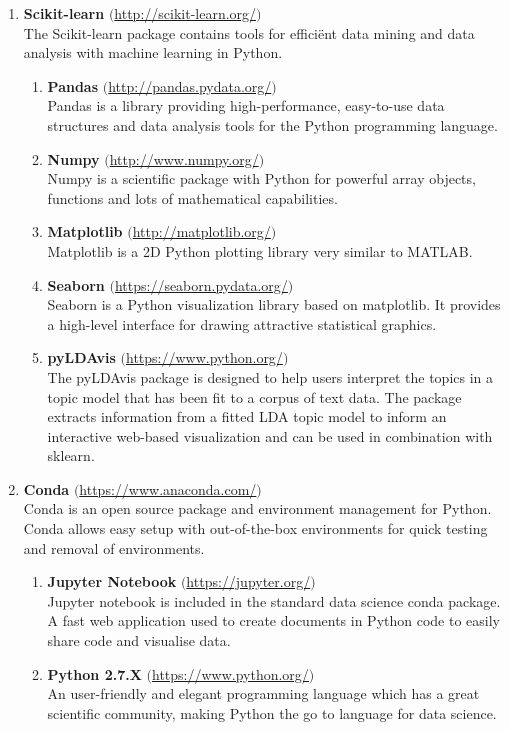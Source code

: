 \begin{enumerate}
    \item \textbf{Scikit-learn} $($\url{http://scikit-learn.org/}$)$ \\
    The Scikit-learn package contains tools for effici\"ent data mining and data analysis with machine learning in Python.
    \begin{enumerate}
        \item \textbf{Pandas} $($\url{http://pandas.pydata.org/}$)$ \\
        Pandas is a library providing high-performance, easy-to-use data structures and data analysis tools for the Python programming language.
        \item \textbf{Numpy} $($\url{http://www.numpy.org/}$)$ \\
        Numpy is a scientific package with Python for powerful array objects, functions and lots of mathematical capabilities.
        \item \textbf{Matplotlib} $($\url{http://matplotlib.org/}$)$ \\
        Matplotlib is a 2D Python plotting library very similar to MATLAB.
        \item \textbf{Seaborn} $($\url{https://seaborn.pydata.org/}$)$ \\
        Seaborn is a Python visualization library based on matplotlib. It provides a high-level interface for drawing attractive statistical graphics.
        \item \textbf{pyLDAvis} $($\url{https://www.python.org/}$)$\\
        The pyLDAvis package is designed to help users interpret the topics in a topic model that has been fit to a corpus of text data. The package extracts information from a fitted LDA topic model to inform an interactive web-based visualization and can be used in combination with sklearn.
    \end{enumerate}
    
    \item \textbf{Conda} $($\url{https://www.anaconda.com/}$)$ \\
    Conda is an open source package and environment management for Python. Conda allows easy setup with out-of-the-box environments for quick testing and removal of environments.
    \begin{enumerate}
        \item \textbf{Jupyter Notebook} $($\url{https://jupyter.org/}$)$ \\
        Jupyter notebook is included in the standard data science conda package. A fast web application used to create documents in Python code to easily share code and visualise data.
        \item \textbf{Python 2.7.X} $($\url{https://www.python.org/}$)$\\
        An user-friendly and elegant programming language which has a great scientific community, making Python the go to language for data science.
    \end{enumerate}
    
    
    
    
\end{enumerate}


